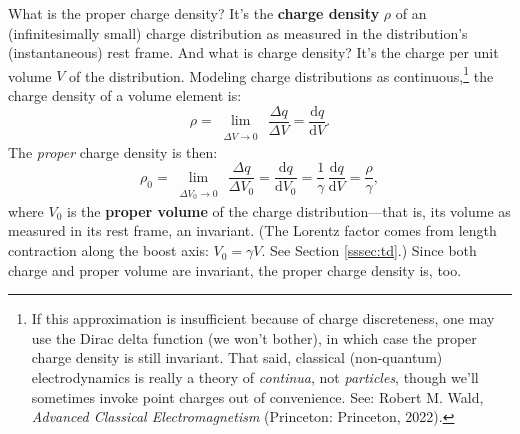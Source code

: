 \documentclass[12pt]{article}
\newcommand{\dd}[1]{\mathrm{d}#1}
\begin{document}
What is the proper charge density? It's the \textbf{charge density} $\rho$ of an (infinitesimally small) charge distribution as measured in the distribution's (instantaneous) rest frame. And what is charge density? It's the charge per unit volume $V$ of the distribution. Modeling charge distributions as continuous,\footnote{\label{fn:ddf}If this approximation is insufficient because of charge discreteness, one may use the Dirac delta function (we won't bother), in which case the proper charge density is still invariant. That said, classical (non-quantum) electrodynamics is really a theory of \emph{continua}, not \emph{particles}, though we'll sometimes invoke point charges out of convenience. See: Robert M. Wald, \emph{Advanced Classical Electromagnetism} (Princeton: Princeton, 2022).} the charge density of a volume element is:
\begin{equation*}
\rho = \lim\limits_{\substack{\\ \Delta V \to 0}} \, \dfrac{\Delta q}{\Delta V} = \dfrac{\dd q}{\dd V} .
\end{equation*}
The \emph{proper} charge density is then:
\begin{equation*}
\rho_0 = \lim\limits_{\substack{\\ \Delta V_0 \to 0}} \, \dfrac{\Delta q}{\Delta V_0} = \dfrac{\dd q}{\dd V_0} = \dfrac{1}{\gamma} \, \dfrac{\dd q}{\dd V} = \dfrac{\rho}{\gamma},
\end{equation*}
where $V_0$ is the \textbf{proper volume} of the charge distribution---that is, its volume as measured in its rest frame, an invariant. (The Lorentz factor comes from length contraction along the boost axis: $V_0 = \gamma V$. See Section \ref{sssec:td}.) Since both charge and proper volume are invariant, the proper charge density is, too.
\end{document}
